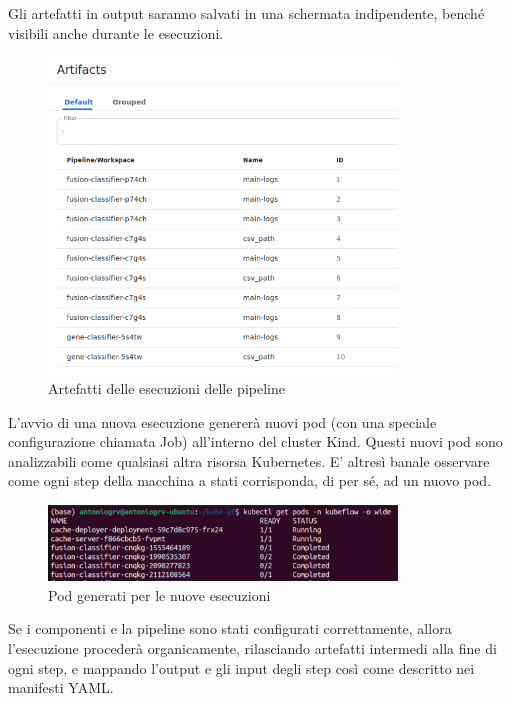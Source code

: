 Gli artefatti in output saranno salvati in una schermata indipendente, benché visibili anche durante le esecuzioni.

\begin{figure}[H]
    \centering
    \includegraphics[width=350px]{figures/ch4and5/artifacts.png}
    \caption[Artefatti delle esecuzioni delle pipeline]{Artefatti delle esecuzioni delle pipeline}
    \label{fig:cha6:art}
\end{figure}

L'avvio di una nuova esecuzione genererà nuovi pod (con una speciale configurazione chiamata Job) all'interno del cluster Kind. Questi nuovi pod sono analizzabili come qualsiasi altra risorsa Kubernetes. E' altresì banale osservare come ogni step della macchina a stati corrisponda, di per sé, ad un nuovo pod.

\begin{figure}[H]
    \centering
    \includegraphics[width=350px]{figures/ch4and5/pods.png}
    \caption[Pod generati per le nuove esecuzioni]{Pod generati per le nuove esecuzioni}
    \label{fig:cha6:kf-pods}
\end{figure}

Se i componenti e la pipeline sono stati configurati correttamente, allora l'esecuzione procederà organicamente, rilasciando artefatti intermedi alla fine di ogni step, e mappando l'output e gli input degli step così come descritto nei manifesti YAML.

